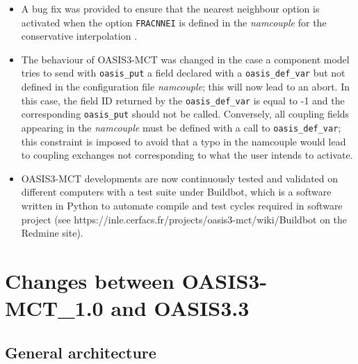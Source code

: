 \begin{itemize}
\item A bug fix was provided to ensure that the nearest neighbour
  option is activated when the option {\tt FRACNNEI} is defined in the
  {\it namcouple} for the conservative interpolation .

\item The behaviour of OASIS3-MCT was changed in the case a
  component model tries to send with {\tt oasis\_put} a field declared
  with a {\tt oasis\_def\_var} but not defined in the configuration
  file {\it namcouple}; this will now lead to an abort. In this case,
  the field ID returned by the {\tt oasis\_def\_var} is equal to -1
  and the corresponding {\tt oasis\_put} should not be called. 
  Conversely, all coupling fields appearing in the {\it namcouple}
  must be defined with a call to {\tt oasis\_def\_var}; this constraint 
is imposed to avoid that a typo in the namcouple would lead to 
coupling exchanges not corresponding to what the user intends to activate.

\item OASIS3-MCT developments are now continuously tested and
  validated on different computers with a test suite under Buildbot,
  which is a software written in Python to automate compile and test
  cycles required in software project (see
  https://inle.cerfacs.fr/projects/oasis3-mct/wiki/Buildbot on the
  Redmine site).

\end{itemize}

\section{Changes between OASIS3-MCT\_1.0 and OASIS3.3}

\subsection{General architecture}
\label{sec_changes_gen}

